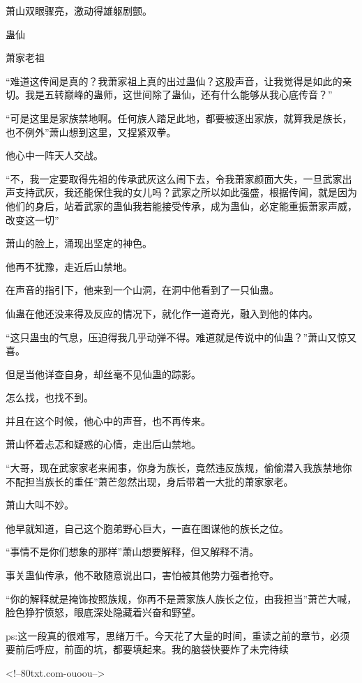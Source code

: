 \begin{this_body}
萧山双眼骤亮，激动得雄躯剧颤。

蛊仙

萧家老祖

“难道这传闻是真的？我萧家祖上真的出过蛊仙？这股声音，让我觉得是如此的亲切。我是五转巅峰的蛊师，这世间除了蛊仙，还有什么能够从我心底传音？”

“可是这里是家族禁地啊。任何族人踏足此地，都要被逐出家族，就算我是族长，也不例外”萧山想到这里，又捏紧双拳。

他心中一阵天人交战。

“不，我一定要取得先祖的传承武灰这么闹下去，令我萧家颜面大失，一旦武家出声支持武灰，我还能保住我的女儿吗？武家之所以如此强盛，根据传闻，就是因为他们的身后，站着武家的蛊仙我若能接受传承，成为蛊仙，必定能重振萧家声威，改变这一切”

萧山的脸上，涌现出坚定的神色。

他再不犹豫，走近后山禁地。

在声音的指引下，他来到一个山洞，在洞中他看到了一只仙蛊。

仙蛊在他还没来得及反应的情况下，就化作一道奇光，融入到他的体内。

“这只蛊虫的气息，压迫得我几乎动弹不得。难道就是传说中的仙蛊？”萧山又惊又喜。

但是当他详查自身，却丝毫不见仙蛊的踪影。

怎么找，也找不到。

并且在这个时候，他心中的声音，也不再传来。

萧山怀着忐忑和疑惑的心情，走出后山禁地。

“大哥，现在武家家老来闹事，你身为族长，竟然违反族规，偷偷潜入我族禁地你不配担当族长的重任”萧芒忽然出现，身后带着一大批的萧家家老。

萧山大叫不妙。

他早就知道，自己这个胞弟野心巨大，一直在图谋他的族长之位。

“事情不是你们想象的那样”萧山想要解释，但又解释不清。

事关蛊仙传承，他不敢随意说出口，害怕被其他势力强者抢夺。

“你的解释就是掩饰按照族规，你再不是萧家族人族长之位，由我担当”萧芒大喊，脸色狰狞愤怒，眼底深处隐藏着兴奋和野望。

ps:这一段真的很难写，思绪万千。今天花了大量的时间，重读之前的章节，必须要前后呼应，前面的坑，都要填起来。我的脑袋快要炸了未完待续

<!--80txt.com-ouoou-->

\end{this_body}

